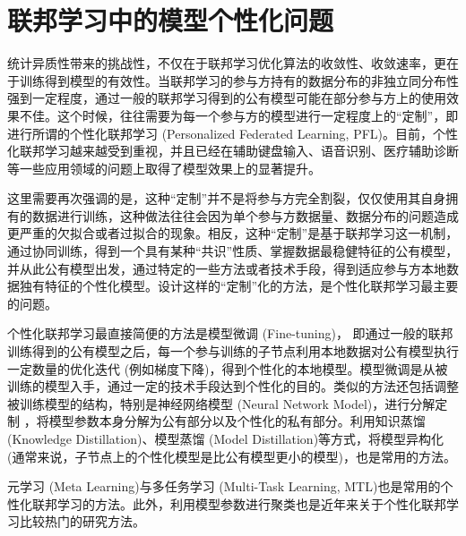 \section{联邦学习中的模型个性化问题}
\label{sec:chap3-pfl}


统计异质性带来的挑战性，不仅在于联邦学习优化算法的收敛性、收敛速率，更在于训练得到模型的有效性\cite{kairouz2019advances_fl}。当联邦学习的参与方持有的数据分布的非独立同分布性强到一定程度，通过一般的联邦学习得到的公有模型可能在部分参与方上的使用效果不佳。这个时候，往往需要为每一个参与方的模型进行一定程度上的``定制''，即进行所谓的个性化联邦学习 (Personalized Federated Learning, PFL)。目前，个性化联邦学习越来越受到重视\cite{Kulkarni_2020_pfl,Tan_2022_pfl}，并且已经在辅助键盘输入\cite{wang2019_pfl}、语音识别\cite{Sim_2019_pfl_audio}、医疗辅助诊断\cite{Tang_2021_pfl_ecg}等一些应用领域的问题上取得了模型效果上的显著提升。

这里需要再次强调的是，这种``定制''并不是将参与方完全割裂，仅仅使用其自身拥有的数据进行训练，这种做法往往会因为单个参与方数据量、数据分布的问题造成更严重的欠拟合或者过拟合的现象。相反，这种``定制''是基于联邦学习这一机制，通过协同训练，得到一个具有某种``共识''性质、掌握数据最稳健特征的公有模型，并从此公有模型出发，通过特定的一些方法或者技术手段，得到适应参与方本地数据独有特征的个性化模型。设计这样的``定制''化的方法，是个性化联邦学习最主要的问题。

个性化联邦学习最直接简便的方法是模型微调 (Fine-tuning)\cite{zhao2018_fl_noniid, Sim_2019_pfl_audio}， 即通过一般的联邦训练得到的公有模型之后，每一个参与训练的子节点利用本地数据对公有模型执行一定数量的优化迭代 (例如梯度下降)，得到个性化的本地模型。模型微调是从被训练的模型入手，通过一定的技术手段达到个性化的目的。类似的方法还包括调整被训练模型的结构，特别是神经网络模型 (Neural Network Model)，进行分解定制\cite{arivazhagan2019_pfl_layer} \cite{Krishna_2022_partial_per_fl}，将模型参数本身分解为公有部分以及个性化的私有部分。利用知识蒸馏 (Knowledge Distillation)\cite{shen2020_fml}、模型蒸馏 (Model Distillation)\cite{li2019_fedmd}等方式，将模型异构化 (通常来说，子节点上的个性化模型是比公有模型更小的模型)，也是常用的方法。

元学习 (Meta Learning)\cite{jiang2019improving, fallah2020personalized, chen2018_fml}与多任务学习 (Multi-Task Learning, MTL)\cite{Smith2017_fl_mtl, smith2017mocha, zhang2021fomo}也是常用的个性化联邦学习的方法。此外，利用模型参数进行聚类\cite{Sattler_2021_cfl, fl_fpfc_2022, Ghosh_2022_cfl, Zhang_2023_fedmds}也是近年来关于个性化联邦学习比较热门的研究方法。


